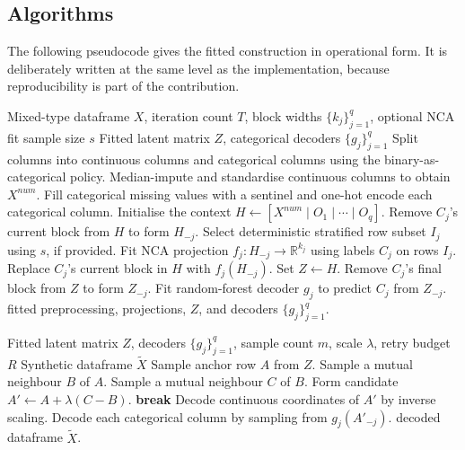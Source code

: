 \subsection{Algorithms}

The following pseudocode gives the fitted construction in operational form.
It is deliberately written at the same level as the implementation, because
reproducibility is part of the contribution.

\begin{algorithm}[t]
\caption{Fit the supervised composite latent representation.}
\label{alg:fit-latent}
\begin{algorithmic}[1]
\Require Mixed-type dataframe $X$, iteration count $T$, block widths $\{k_j\}_{j=1}^q$, optional NCA fit sample size $s$
\Ensure Fitted latent matrix $Z$, categorical decoders $\{g_j\}_{j=1}^q$
\State Split columns into continuous columns and categorical columns using the binary-as-categorical policy.
\State Median-impute and standardise continuous columns to obtain $X^{num}$.
\State Fill categorical missing values with a sentinel and one-hot encode each categorical column.
\State Initialise the context $H \gets [X^{num}\mid O_1 \mid \cdots \mid O_q]$.
    \State Remove $C_j$'s current block from $H$ to form $H_{-j}$.
    \State Select deterministic stratified row subset $I_j$ using $s$, if provided.
    \State Fit NCA projection $f_j:H_{-j}\rightarrow\mathbb{R}^{k_j}$ using labels $C_j$ on rows $I_j$.
    \State Replace $C_j$'s current block in $H$ with $f_j(H_{-j})$.
  \EndFor
\EndFor
\State Set $Z \gets H$.
  \State Remove $C_j$'s final block from $Z$ to form $Z_{-j}$.
  \State Fit random-forest decoder $g_j$ to predict $C_j$ from $Z_{-j}$.
\EndFor
\State \Return fitted preprocessing, projections, $Z$, and decoders $\{g_j\}_{j=1}^q$.
\end{algorithmic}
\end{algorithm}

\begin{algorithm}[t]
\caption{Generate synthetic rows by local displacement transfer.}
\label{alg:generate}
\begin{algorithmic}[1]
\Require Fitted latent matrix $Z$, decoders $\{g_j\}_{j=1}^q$, sample count $m$, scale $\lambda$, retry budget $R$
\Ensure Synthetic dataframe $\widetilde{X}$
    \State Sample anchor row $A$ from $Z$.
    \State Sample a mutual neighbour $B$ of $A$.
    \State Sample a mutual neighbour $C$ of $B$.
    \State Form candidate $A' \gets A + \lambda(C-B)$.
      \State \textbf{break}
    \EndIf
  \EndFor
  \State Decode continuous coordinates of $A'$ by inverse scaling.
  \State Decode each categorical column by sampling from $g_j(A'_{-j})$.
\EndFor
\State \Return decoded dataframe $\widetilde{X}$.
\end{algorithmic}
\end{algorithm}

